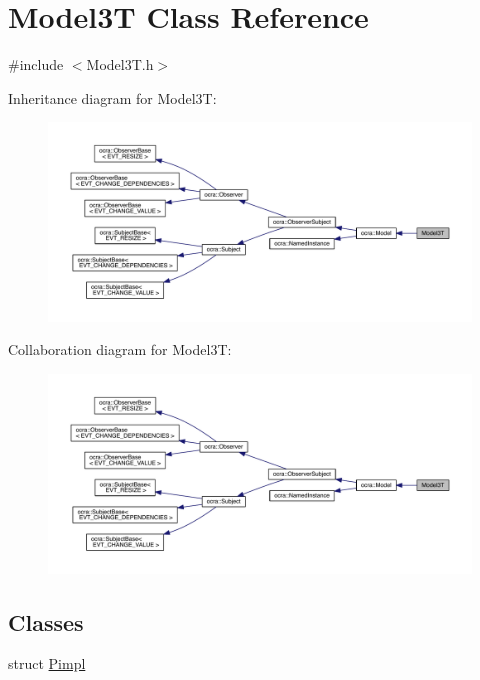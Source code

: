 \hypertarget{classModel3T}{}\section{Model3T Class Reference}
\label{classModel3T}


{\ttfamily \#include $<$Model3\+T.\+h$>$}



Inheritance diagram for Model3T\+:
\nopagebreak
\begin{figure}[H]
\begin{center}
\leavevmode
\includegraphics[width=350pt]{da/dd6/classModel3T__inherit__graph}
\end{center}
\end{figure}


Collaboration diagram for Model3T\+:
\nopagebreak
\begin{figure}[H]
\begin{center}
\leavevmode
\includegraphics[width=350pt]{dd/d8d/classModel3T__coll__graph}
\end{center}
\end{figure}
\subsection*{Classes}
\begin{DoxyCompactItemize}
\item 
struct \hyperlink{structModel3T_1_1Pimpl}{Pimpl}
\end{DoxyCompactItemize}
